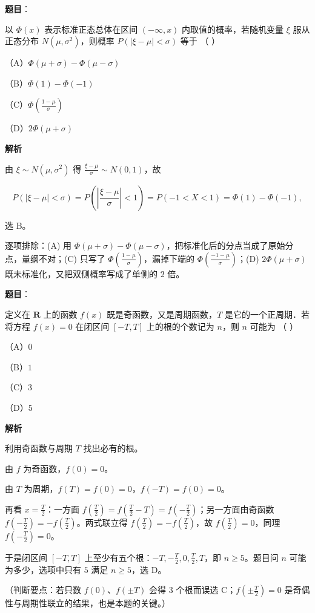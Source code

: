 \begin{answer}

\textbf{题目}：

以 $\Phi(x)$ 表示标准正态总体在区间 $(-\infty,x)$ 内取值的概率，若随机变量 $\xi$ 服从正态分布 $N(\mu,\sigma^2)$，则概率 $P(|\xi-\mu|<\sigma)$ 等于 （ ）

（A）$\Phi(\mu+\sigma)-\Phi(\mu-\sigma)$

（B）$\Phi(1)-\Phi(-1)$

（C）$\Phi\left(\frac{1-\mu}{\sigma}\right)$

（D）$2\Phi(\mu+\sigma)$

\textbf{解析}

由 $\xi\sim N(\mu,\sigma^2)$ 得 $\frac{\xi-\mu}{\sigma}\sim N(0,1)$，故

\nopagebreak[4]
\[P(|\xi-\mu|<\sigma)=P\left(\left|\frac{\xi-\mu}{\sigma}\right|<1\right)=P(-1<X<1)=\Phi(1)-\Phi(-1),\]

选 B。

逐项排除：(A) 用 $\Phi(\mu+\sigma)-\Phi(\mu-\sigma)$，把标准化后的分点当成了原始分点，量纲不对；(C) 只写了 $\Phi\left(\frac{1-\mu}{\sigma}\right)$，漏掉下端的 $\Phi\left(\frac{-1-\mu}{\sigma}\right)$；(D) $2\Phi(\mu+\sigma)$ 既未标准化，又把双侧概率写成了单侧的 $2$ 倍。


\end{answer}
\begin{answer}

\textbf{题目}：

定义在 $\mathbf R$ 上的函数 $f(x)$ 既是奇函数，又是周期函数，$T$ 是它的一个正周期．若将方程 $f(x)=0$ 在闭区间 $[-T,T]$ 上的根的个数记为 $n$，则 $n$ 可能为 （ ）

（A）$0$

（B）$1$

（C）$3$

（D）$5$

\textbf{解析}

利用奇函数与周期 $T$ 找出必有的根。

由 $f$ 为奇函数，$f(0)=0$。

由 $T$ 为周期，$f(T)=f(0)=0$，$f(-T)=f(0)=0$。

再看 $x=\frac T2$：一方面 $f\left(\frac T2\right)=f\left(\frac T2-T\right)=f\left(-\frac T2\right)$；另一方面由奇函数 $f\left(-\frac T2\right)=-f\left(\frac T2\right)$。两式联立得 $f\left(\frac T2\right)=-f\left(\frac T2\right)$，故 $f\left(\frac T2\right)=0$，同理 $f\left(-\frac T2\right)=0$。

于是闭区间 $[-T,T]$ 上至少有五个根：$-T,-\frac T2,0,\frac T2,T$，即 $n\geqslant5$。题目问 $n$ 可能为多少，选项中只有 $5$ 满足 $n\geqslant5$，选 D。

（判断要点：若只数 $f(0)$、$f(\pm T)$ 会得 $3$ 个根而误选 C；$f\left(\pm\frac T2\right)=0$ 是奇偶性与周期性联立的结果，也是本题的关键。）


\end{answer}
